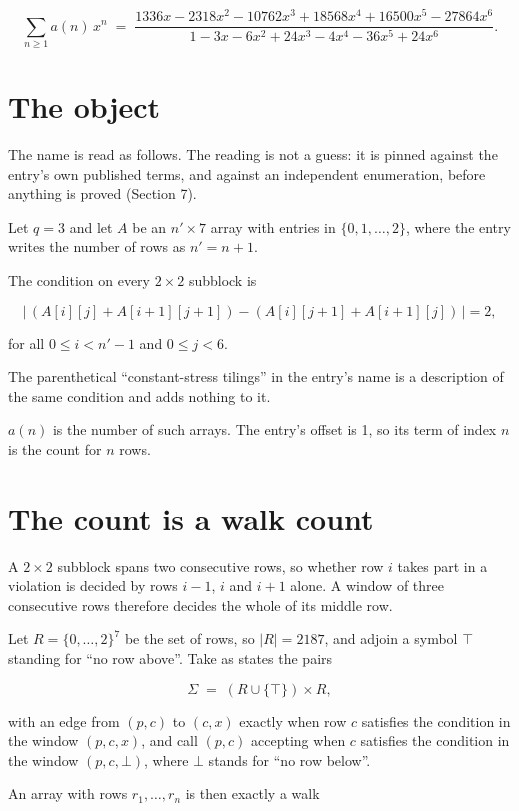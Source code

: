 \documentclass[11pt]{article}
\theoremstyle{definition}
\begin{document}
\[\sum_{n \ge 1} a(n)\,x^n \;=\; \frac{1336x - 2318x^{2} - 10762x^{3} + 18568x^{4} + 16500x^{5} - 27864x^{6}}{1 - 3x - 6x^{2} + 24x^{3} - 4x^{4} - 36x^{5} + 24x^{6}}.\]

\section{The object}

The name is read as follows. The reading is not a guess: it is pinned against the entry's own published terms, and against an independent enumeration, before anything is proved (Section 7).

Let $q = 3$ and let $A$ be an $n' \times 7$ array with entries in $\{0,1,\dots,2\}$, where the entry writes the number of rows as $n' = n + 1$.

The condition on every $2 \times 2$ subblock is

\[\bigl|\,(A[i][j] + A[i{+}1][j{+}1]) - (A[i][j{+}1] + A[i{+}1][j])\,\bigr| = 2,\]

for all $0 \le i < n'-1$ and $0 \le j < 6$.

The parenthetical ``constant-stress tilings'' in the entry's name is a description of the same condition and adds nothing to it.

$a(n)$ is the number of such arrays. The entry's offset is 1, so its term of index $n$ is the count for $n$ rows.

\section{The count is a walk count}

A $2 \times 2$ subblock spans two consecutive rows, so whether row $i$ takes part in a violation is decided by rows $i-1$, $i$ and $i+1$ alone. A window of three consecutive rows therefore decides the whole of its middle row.

Let $R = \{0,\dots,2\}^{7}$ be the set of rows, so $|R| = 2187$, and adjoin a symbol $\top$ standing for ``no row above''. Take as states the pairs

\[\Sigma \;=\; (R \cup \{\top\}) \times R,\]

with an edge from $(p,c)$ to $(c,x)$ exactly when row $c$ satisfies the condition in the window $(p,c,x)$, and call $(p,c)$ accepting when $c$ satisfies the condition in the window $(p,c,\bot)$, where $\bot$ stands for ``no row below''.

An array with rows $r_1,\dots,r_n$ is then exactly a walk
\end{document}
